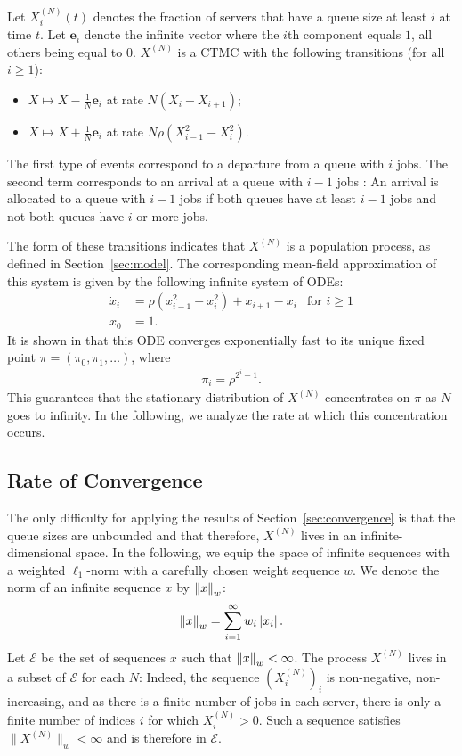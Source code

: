 \documentclass[sigconf]{acmart}
\newcommand\XN{X^{(N)}}
\newcommand\E{\mathcal{E}}
\newcommand\norm[1]{{\mathchoice{\bnorm{#1}}{\snorm{#1}}{\snorm{#1}}{\snorm{#1}}}}
\newcommand\bnorm[1]{\left\|#1\right\|}
\newcommand\snorm[1]{\|#1\|}
\newcommand\abs[1]{\left|#1\right|}
\begin{document}
Let $\XN_i(t)$ denotes the fraction of servers that have a queue size
at least $i$ at time $t$. Let $\mathbf{e}_i$ denote the infinite
vector where the $i$th component equals $1$, all others being equal to
$0$.  $\XN$ is a CTMC with the following transitions (for all
$i\ge1$):
\begin{itemize}
\item $X \mapsto X-\frac{1}{N}\mathbf{e}_i$ at rate $N(X_{i}-X_{i+1})$;
\item $X \mapsto X+\frac1N\mathbf{e}_i$ at rate
  $N\rho(X^2_{i-1}-X^2_{i})$.
\end{itemize}
The first type of events correspond to a departure from a queue with
$i$ jobs. The second term corresponds to an arrival at a queue with
$i-1$ jobs : An arrival is allocated to a queue with $i-1$ jobs if
both queues have at least $i-1$ jobs and not both queues have $i$ or
more jobs.

The form of these transitions indicates that $\XN$ is a population
process, as defined in Section~\ref{sec:model}. The corresponding
mean-field approximation of this system is given by the following
infinite system of ODEs:
\begin{align*}
  \dot{x}_i &= \rho(x^2_{i-1}-x_i^2) + x_{i+1}-x_{i}
  &\text{for $i\ge1$}\\
  x_0 &= 1.
\end{align*}
It is shown in \cite{mitzenmacher1996power} that this ODE converges
exponentially fast to its unique fixed point
$\pi=(\pi_0,\pi_1,\dots)$, where
\begin{align*}
  \pi_{i} = \rho^{2^i-1}.  
\end{align*}
This guarantees that the stationary distribution of $\XN$ concentrates
on $\pi$ as $N$ goes to infinity.  In the following, we analyze the
rate at which this concentration occurs. 


\subsection{Rate of Convergence} 

The only difficulty for applying the results of
Section~\ref{sec:convergence} is that the queue sizes are unbounded
and that therefore, $\XN$ lives in an infinite-dimensional space. In
the following, we equip the space of infinite sequences with a
weighted $\ell_1$-norm with a carefully chosen weight sequence $w$. We
denote the norm of an infinite sequence $x$ by $\norm{x}_w$:
\begin{align*}
  \norm{x}_w=\sum_{i=1}^\infty w_i\abs{x_i}.
\end{align*}
Let $\E$ be the set of sequences $x$ such that $\norm{x}_w<\infty$.
The process $\XN$ lives in a subset of $\E$ for each $N$: Indeed, the
sequence $(\XN_i)_i$ is non-negative, non-increasing, and as there is
a finite number of jobs in each server, there is only a finite number
of indices $i$ for which $\XN_i>0$. Such a sequence satisfies
$\snorm{\XN}_w<\infty$ and is therefore in $\E$.
\end{document}
